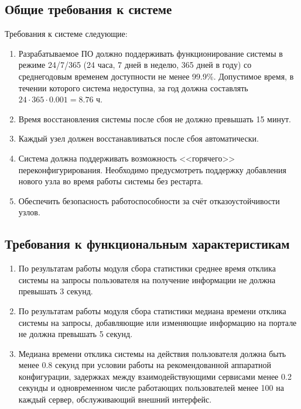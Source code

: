 \documentclass[a4paper, 12pt]{article}
\begin{document}
\begin{large}
\subsection{Общие требования к системе}
Требования к системе следующие:
\begin{enumerate}
	\item Разрабатываемое ПО должно поддерживать функционирование системы в режиме 24/7/365 (24 часа, 7 дней в неделю, 365 дней в году) со среднегодовым временем доступности не менее 99.9\%. Допустимое время, в течении которого система недоступна, за год должна составлять $24\cdot365\cdot0.001=8.76$ ч.
	
	\item Время восстановления системы после сбоя не должно превышать 15 минут.
	
	\item Каждый узел должен восстанавливаться после сбоя автоматически.
	
	\item Система должна поддерживать возможность <<горячего>> переконфигурирования. Необходимо предусмотреть поддержку добавления нового узла во время работы системы без рестарта.
	
	\item Обеспечить безопасность работоспособности за счёт отказоустойчивости узлов.
\end{enumerate}

\subsection{Требования к функциональным характеристикам}
\begin{enumerate}
	\item По результатам работы модуля сбора статистики среднее время отклика системы на запросы пользователя на получение информации не должна превышать 3 секунд.
	
	\item По результатам работы модуля сбора статистики медиана времени отклика системы на запросы, добавляющие или изменяющие информацию на портале не должна превышать 5 секунд.
	
	\item Медиана времени отклика системы на действия пользователя должна быть менее 0.8 секунд при условии работы на рекомендованной аппаратной конфигурации, задержках между взаимодействующими сервисами менее 0.2 секунды и одновременном числе работающих пользователей менее 100 на каждый сервер, обслуживающий внешний интерфейс.
\end{enumerate}


\end{large}
\end{document}
